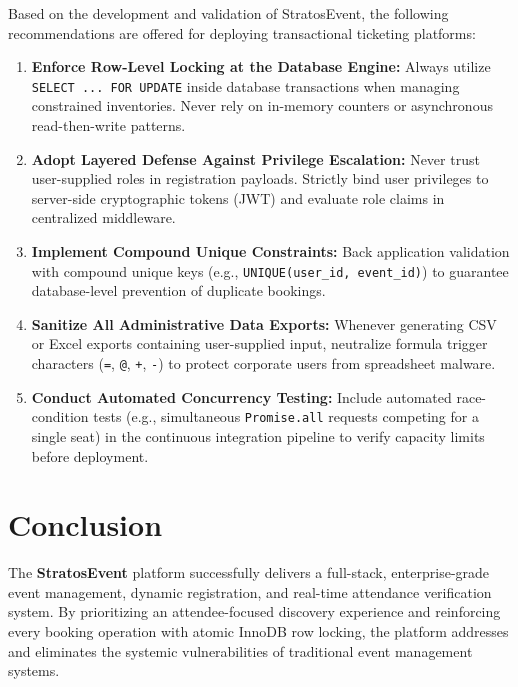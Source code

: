 \documentclass[11pt,a4paper]{article}
\begin{document}
\justifying

Based on the development and validation of StratosEvent, the following recommendations are offered for deploying transactional ticketing platforms:

\begin{enumerate}[leftmargin=*]
    \item \textbf{Enforce Row-Level Locking at the Database Engine:} Always utilize \texttt{SELECT ... FOR UPDATE} inside database transactions when managing constrained inventories. Never rely on in-memory counters or asynchronous read-then-write patterns.
    \item \textbf{Adopt Layered Defense Against Privilege Escalation:} Never trust user-supplied roles in registration payloads. Strictly bind user privileges to server-side cryptographic tokens (JWT) and evaluate role claims in centralized middleware.
    \item \textbf{Implement Compound Unique Constraints:} Back application validation with compound unique keys (e.g., \texttt{UNIQUE(user\_id, event\_id)}) to guarantee database-level prevention of duplicate bookings.
    \item \textbf{Sanitize All Administrative Data Exports:} Whenever generating CSV or Excel exports containing user-supplied input, neutralize formula trigger characters (\texttt{=}, \texttt{@}, \texttt{+}, \texttt{-}) to protect corporate users from spreadsheet malware.
    \item \textbf{Conduct Automated Concurrency Testing:} Include automated race-condition tests (e.g., simultaneous \texttt{Promise.all} requests competing for a single seat) in the continuous integration pipeline to verify capacity limits before deployment.
\end{enumerate}

\newpage
\section*{{\color{TitleBlue}\bfseries
\fontsize{18}{22}\selectfont Conclusion}}

\justifying

The \textbf{StratosEvent} platform successfully delivers a full-stack, enterprise-grade event management, dynamic registration, and real-time attendance verification system. By prioritizing an attendee-focused discovery experience and reinforcing every booking operation with atomic InnoDB row locking, the platform addresses and eliminates the systemic vulnerabilities of traditional event management systems.
\end{document}
